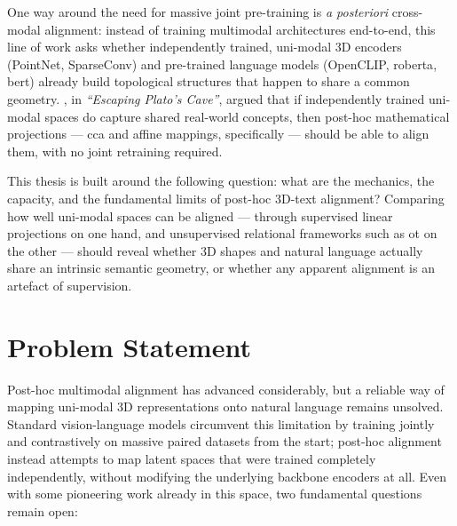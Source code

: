 One way around the need for massive joint pre-training is \emph{a posteriori} cross-modal alignment: instead of training multimodal architectures end-to-end, this line of work asks whether independently trained, uni-modal 3D encoders (PointNet, SparseConv) and pre-trained language models (OpenCLIP, \gls{roberta}, \gls{bert}) already build topological structures that happen to share a common geometry. \textcite{hadgi2025escaping}, in \emph{``Escaping Plato's Cave''}, argued that if independently trained uni-modal spaces do capture shared real-world concepts, then post-hoc mathematical projections --- \gls{cca} and affine mappings, specifically --- should be able to align them, with no joint retraining required.

This thesis is built around the following question: what are the mechanics, the capacity, and the fundamental limits of post-hoc 3D-text alignment? Comparing how well uni-modal spaces can be aligned --- through supervised linear projections on one hand, and unsupervised relational frameworks such as \gls{ot} on the other --- should reveal whether 3D shapes and natural language actually share an intrinsic semantic geometry, or whether any apparent alignment is an artefact of supervision.

\section{Problem Statement}
\label{sec:problem_statement}

Post-hoc multimodal alignment has advanced considerably, but a reliable way of mapping uni-modal 3D representations onto natural language remains unsolved. Standard vision-language models circumvent this limitation by training jointly and contrastively on massive paired datasets from the start; post-hoc alignment instead attempts to map latent spaces that were trained completely independently, without modifying the underlying backbone encoders at all. Even with some pioneering work already in this space, two fundamental questions remain open:

